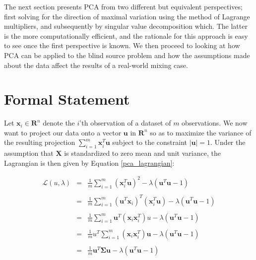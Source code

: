 \documentclass[11pt, oneside, a4paper]{report}
\begin{document}
The next section presents PCA from two different but equivalent
perspectives; first solving for the direction of maximal variation
using the method of Lagrange multipliers, and subsequently by singular
value decomposition which. The latter is the more computationally
efficient, and the rationale for this approach is easy to see once the
first perspective is known. We then proceed to looking at how PCA can
be applied to the blind source problem and how the assumptions made
about the data affect the results of a real-world mixing case.


\section{Formal Statement}

Let $\boldsymbol{x}_i \in \mathbf{R}^n$ denote the $i$'th observation of a dataset
of $m$ observations. We now want to project our data onto a vector $\boldsymbol{u}$
in $\mathbf{R}^n$ so as to maximize the variance of the resulting
projection $\sum_{i=1}^m \boldsymbol{x}_i^T \boldsymbol{u}$ subject to the constraint
$|\boldsymbol{u}|=1$. Under the assumption that $\boldsymbol{X}$ is
standardized to zero mean and unit variance, the Lagrangian is then given by Equation \ref{pca_lagrangian}:

  \begin{equation}
    \label{pca_lagrangian}
    \begin{array}{lcl}
      \mathcal{L}(u,\lambda) & = & \frac{1}{m} \sum_{i=1}^m (\boldsymbol{x}_i^T \boldsymbol{u})^2 - \lambda (\boldsymbol{u}^T \boldsymbol{u} -1) \\
      \\& = & \frac{1}{m} \sum_{i=1}^m (\boldsymbol{u}^T \boldsymbol{x}_i)^T(\boldsymbol{x}_i^T \boldsymbol{u}) - \lambda (\boldsymbol{u}^T \boldsymbol{u} -1) \\
      \\& = & \frac{1}{m} \sum_{i=1}^m \boldsymbol{u}^T(\boldsymbol{x}_i \boldsymbol{x}_i^T)u - \lambda (\boldsymbol{u}^T \boldsymbol{u} -1) \\
      \\& = & \frac{1}{m}  u^T\sum_{i=1}^m(\boldsymbol{x}_i \boldsymbol{x}_i^T)\boldsymbol{u} - \lambda (\boldsymbol{u}^T \boldsymbol{u} -1) \\
      \\& = & \frac{1}{m} \boldsymbol{u}^T \boldsymbol{\Sigma} \boldsymbol{u} - \lambda (\boldsymbol{u}^T \boldsymbol{u} -1) \\
    \end{array}
  \end{equation}
\end{document}
